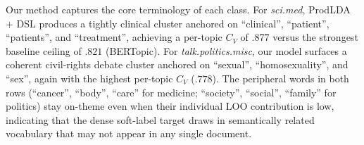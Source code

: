 \documentclass{article}
\theoremstyle{plain}
\theoremstyle{definition}
\theoremstyle{remark}
\begin{document}
Our method captures the core terminology of each class. For
\textit{sci.med}, ProdLDA + DSL produces a tightly clinical cluster
anchored on ``clinical'', ``patient'', ``patients'', and ``treatment'',
achieving a per-topic $C_V$ of $.877$ versus the strongest baseline ceiling
of $.821$ (BERTopic). For \textit{talk.politics.misc}, our model surfaces
a coherent civil-rights debate cluster anchored on ``sexual'',
``homosexuality'', and ``sex'', again with the highest per-topic $C_V$ ($.778$). The peripheral words in both rows (``cancer'', ``body'', ``care'' for medicine; ``society'', ``social'', ``family'' for politics) stay on-theme even when their individual LOO contribution is low, indicating that the dense soft-label target draws in semantically related vocabulary that may not appear in any single document.


\end{document}
